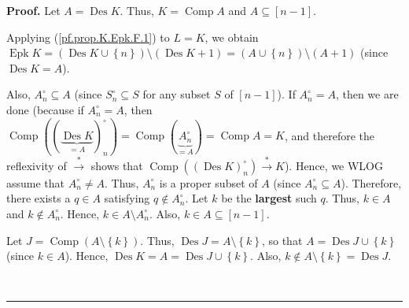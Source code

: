 \documentclass[numbers=enddot,12pt,final,onecolumn,notitlepage]{scrartcl}%
\theoremstyle{definition}
\newenvironment{proof}[1][Proof]{\noindent\textbf{#1.} }{\ \rule{0.5em}{0.5em}}
\begin{document}
\begin{proof}
Let $A=\operatorname*{Des}K$. Thus, $K=\operatorname*{Comp}A$ and
$A\subseteq\left[  n-1\right]  $.

Applying (\ref{pf.prop.K.Epk.F.1}) to $L=K$, we obtain $\operatorname*{Epk}%
K=\left(  \operatorname*{Des}K\cup\left\{  n\right\}  \right)  \setminus
\left(  \operatorname*{Des}K+1\right)  =\left(  A\cup\left\{  n\right\}
\right)  \setminus\left(  A+1\right)  $ (since $\operatorname*{Des}K=A$).

Also, $A_{n}^{\circ}\subseteq A$ (since $S_{n}^{\circ}\subseteq S$ for any
subset $S$ of $\left[  n-1\right]  $). If $A_{n}^{\circ}=A$, then we are done
(because if $A_{n}^{\circ}=A$, then $\operatorname*{Comp}\left(  \left(
\underbrace{\operatorname*{Des}K}_{=A}\right)  _{n}^{\circ}\right)
=\operatorname*{Comp}\left(  \underbrace{A_{n}^{\circ}}_{=A}\right)
=\operatorname*{Comp}A=K$, and therefore the reflexivity of $\overset{\ast
}{\rightarrow}$ shows that $\operatorname*{Comp}\left(  \left(
\operatorname*{Des}K\right)  _{n}^{\circ}\right)  \overset{\ast}{\rightarrow
}K$). Hence, we WLOG assume that $A_{n}^{\circ}\neq A$. Thus, $A_{n}^{\circ}$
is a proper subset of $A$ (since $A_{n}^{\circ}\subseteq A$). Therefore, there
exists a $q\in A$ satisfying $q\notin A_{n}^{\circ}$. Let $k$ be the
\textbf{largest} such $q$. Thus, $k\in A$ and $k\notin A_{n}^{\circ}$. Hence,
$k\in A\setminus A_{n}^{\circ}$. Also, $k\in A\subseteq\left[  n-1\right]  $.

Let $J=\operatorname*{Comp}\left(  A\setminus\left\{  k\right\}  \right)  $.
Thus, $\operatorname*{Des}J=A\setminus\left\{  k\right\}  $, so that
$A=\operatorname*{Des}J\cup\left\{  k\right\}  $ (since $k\in A$). Hence,
$\operatorname*{Des}K=A=\operatorname*{Des}J\cup\left\{  k\right\}  $. Also,
$k\notin A\setminus\left\{  k\right\}  =\operatorname*{Des}J$.


\end{proof}
\end{document}
